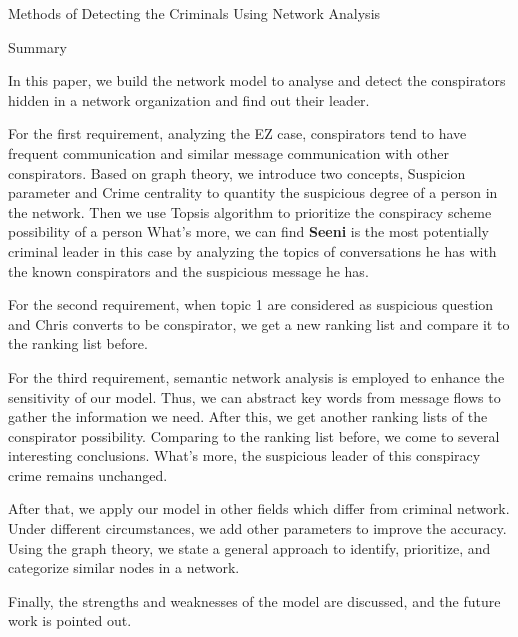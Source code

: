\documentclass[12pt]{article}
\begin{document}
\begin{center}
\Large Methods of Detecting the Criminals Using Network Analysis
\end{center}

\begin{center}
\large Summary
\end{center}

	In this paper, we build the network model to analyse and detect the conspirators hidden in a network organization and find out their leader.
	
	For the first requirement, analyzing the EZ case, conspirators tend to have frequent communication and similar message communication with other conspirators. Based on graph theory, we introduce two concepts, Suspicion parameter and Crime centrality to quantity the suspicious degree of a person in the network. Then we use Topsis algorithm to prioritize the conspiracy scheme possibility of a person What’s more, we can find \textbf{Seeni} is the most potentially criminal leader in this case by analyzing the topics of conversations he has with the known conspirators and the suspicious message he has. 

	For the second requirement, when topic 1 are considered as suspicious question and Chris converts to be conspirator, we get a new ranking list and compare it to the ranking list before.

	For the third requirement, semantic network analysis is employed to enhance the sensitivity of our model. Thus, we can abstract key words from message flows to gather the information we need. After this, we get another ranking lists of the conspirator possibility. Comparing to the ranking list before, we come to several interesting conclusions. What’s more, the suspicious leader of this conspiracy crime remains unchanged.
 
	After that, we apply our model in other fields which differ from criminal network. Under different circumstances, we add other parameters to improve the accuracy. Using the graph theory, we state a general approach to identify, prioritize, and categorize similar nodes in a network. 

	Finally, the strengths and weaknesses of the model are discussed, and the future work is pointed out.

\vspace{5cm}

\tableofcontents

\vspace{8cm}
\end{document}
